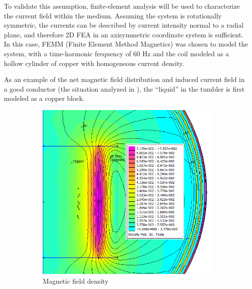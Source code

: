 \documentclass[]{article}
\begin{document}
\par To validate this assumption, finite-element analysis will be used to characterize the current field within the medium. Assuming the system is rotationally symmetric, the currents can be described by current intensity normal to a radial plane, and therefore 2D FEA in an axisymmetric coordinate system is sufficient. In this case, FEMM (Finite Element Method Magnetics) was chosen to model the system, with a time-harmonic frequency of 60 Hz and the coil modeled as a hollow cylinder of copper with homogeneous current density. 
\par As an example of the net magnetic field distribution and induced current field in a good conductor (the situation analyzed in \cite{analyticeddy}), the ``liquid'' in the tumbler is first modeled as a copper block.
\begin{figure}[h]
	\centering
	\begin{subfigure}{0.45\textwidth}
		\centering
		\includegraphics[width=1\textwidth]{CopperB}
		\caption{Magnetic field density}
		\label{fig:copperb}
	\end{subfigure}
	\begin{subfigure}{0.45\textwidth}
		\centering

\end{subfigure}
\end{figure}
\end{document}
